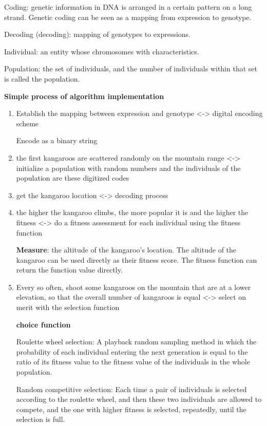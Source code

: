\documentclass[twocolumn]{article}
\begin{document}
	Coding: genetic information in DNA is arranged in a certain pattern on
	a long strand. Genetic coding can be seen as a mapping from expression
	to genotype.

	Decoding (decoding): mapping of genotypes to expressions.

	Individual: an entity whose chromosomes with characteristics.

	Population: the set of individuals, and the number of individuals
	within that set is called the population.


\textbf{Simple process of algorithm implementation}

\begin{enumerate}
	\def\labelenumi{\arabic{enumi}.}
	\item
	Establish the mapping between expression and genotype
	\textless-\textgreater{} digital encoding scheme
	
	Encode as a binary string
	\item
	the first kangaroos are scattered randomly on the mountain range
	\textless-\textgreater{} initialize a population with random numbers
	and the individuals of the population are these digitized codes
	\item
	get the kangaroo location \textless-\textgreater{} decoding process
	\item
	the higher the kangaroo climbs, the more popular it is and the higher
	the fitness \textless-\textgreater{} do a fitness assessment for each
	individual using the fitness function
	
	\textbf{Measure}: the altitude of the kangaroo's location. The
	altitude of the kangaroo can be used directly as their fitness score.
	The fitness function can return the function value directly.
	\item
	Every so often, shoot some kangaroos on the mountain that are at a
	lower elevation, so that the overall number of kangaroos is equal
	\textless-\textgreater{} select on merit with the selection function
	
	\textbf{choice function}
	
		
		Roulette wheel selection: A playback random sampling method in which
		the probability of each individual entering the next generation is
		equal to the ratio of its fitness value to the fitness value of the
		individuals in the whole population.
	
		Random competitive selection: Each time a pair of individuals is
		selected according to the roulette wheel, and then these two
		individuals are allowed to compete, and the one with higher fitness
		is selected, repeatedly, until the selection is full.
	

\end{enumerate}
\end{document}
